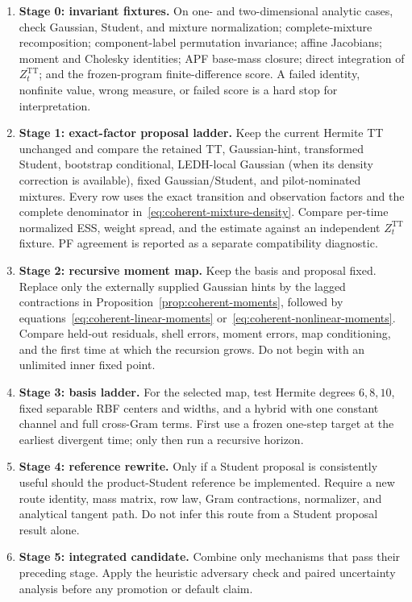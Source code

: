 \documentclass[11pt]{article}
\begin{document}
\begin{enumerate}
\item \textbf{Stage 0: invariant fixtures.} On one- and two-dimensional
  analytic cases, check Gaussian, Student, and mixture normalization;
  complete-mixture recomposition; component-label permutation invariance;
  affine Jacobians; moment and Cholesky identities; APF base-mass closure;
  direct integration of $Z_t^{\mathrm{TT}}$; and the frozen-program
  finite-difference score. A failed identity, nonfinite value, wrong measure,
  or failed score is a hard stop for interpretation.
\item \textbf{Stage 1: exact-factor proposal ladder.} Keep the current
  Hermite TT unchanged and compare the retained TT, Gaussian-hint,
  transformed Student, bootstrap conditional, LEDH-local Gaussian (when its
  density correction is available), fixed Gaussian/Student, and pilot-nominated
  mixtures. Every row uses the exact transition and observation factors and
  the complete denominator in~\eqref{eq:coherent-mixture-density}. Compare
  per-time normalized ESS, weight spread, and the estimate against an
  independent $Z_t^{\mathrm{TT}}$ fixture. PF agreement is reported as a
  separate compatibility diagnostic.
\item \textbf{Stage 2: recursive moment map.} Keep the basis and proposal
  fixed. Replace only the externally supplied Gaussian hints by the lagged
  contractions in Proposition~\ref{prop:coherent-moments}, followed by
  equations~\eqref{eq:coherent-linear-moments} or~\eqref{eq:coherent-nonlinear-moments}.
  Compare held-out residuals, shell errors, moment errors, map conditioning,
  and the first time at which the recursion grows. Do not begin with an
  unlimited inner fixed point.
\item \textbf{Stage 3: basis ladder.} For the selected map, test Hermite
  degrees $6,8,10$, fixed separable RBF centers and widths, and a hybrid with
  one constant channel and full cross-Gram terms. First use a frozen one-step
  target at the earliest divergent time; only then run a recursive horizon.
\item \textbf{Stage 4: reference rewrite.} Only if a Student proposal is
  consistently useful should the product-Student reference be implemented.
  Require a new route identity, mass matrix, row law, Gram contractions,
  normalizer, and analytical tangent path. Do not infer this route from a
  Student proposal result alone.
\item \textbf{Stage 5: integrated candidate.} Combine only mechanisms that
  pass their preceding stage. Apply the heuristic adversary check and paired
  uncertainty analysis before any promotion or default claim.
\end{enumerate}
\end{document}
